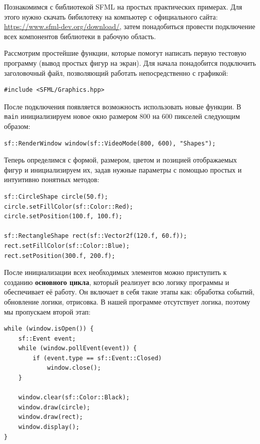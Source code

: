 Познакомимся с библиотекой SFML на простых практических примерах. Для этого нужно скачать бибилотеку на компьютер с официального сайта: \url{https://www.sfml-dev.org/download/}, затем понадобиться провести подключение всех компонентов библиотеки в рабочую область.

Рассмотрим простейшие функции, которые помогут написать первую тестовую программу (вывод простых фигур на экран). Для начала понадобится подключить заголовочный файл, позволяющий работать непосредственно с графикой:

\begin{lstlisting}[style=myStyle, numbers=none]
#include <SFML/Graphics.hpp>
\end{lstlisting}

После подключения появляется возможность использовать новые функции. В \texttt{main} инициализируем новое окно размером 800 на 600 пикселей следующим образом:

\begin{lstlisting}[style=myStyle, numbers=none]
sf::RenderWindow window(sf::VideoMode(800, 600), "Shapes");
\end{lstlisting}

Теперь определимся с формой, размером, цветом и позицией отображаемых фигур и инициализируем их, задав нужные параметры с помощью простых и интуитивно понятных методов:

\begin{lstlisting}[style=myStyle]
sf::CircleShape circle(50.f);
circle.setFillColor(sf::Color::Red);
circle.setPosition(100.f, 100.f);

sf::RectangleShape rect(sf::Vector2f(120.f, 60.f));
rect.setFillColor(sf::Color::Blue);
rect.setPosition(300.f, 200.f);
\end{lstlisting}

После инициализации всех необходимых элементов можно приступить к созданию \textbf{основного цикла}, который реализует всю логику программы и обеспечивает её работу. Он включает в себя такие этапы как: обработка событий, обновление логики, отрисовка. В нашей программе отсутствует логика, поэтому мы пропускаем второй этап:

\begin{lstlisting}[style=myStyle]
while (window.isOpen()) {
    sf::Event event;
    while (window.pollEvent(event)) {
        if (event.type == sf::Event::Closed)
            window.close();
    }

    window.clear(sf::Color::Black);
    window.draw(circle);
    window.draw(rect);
    window.display();
}
\end{lstlisting}

